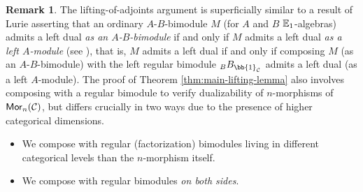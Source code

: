 \documentclass[10pt, reqno, twoside
, final
]{amsart}
\numberwithin{equation}{subsection}%
\theoremstyle{definition}
\theoremstyle{definition}
\theoremstyle{definition}
\theoremstyle{definition}
\theoremstyle{definition}
\theoremstyle{definition}
\theoremstyle{definition}
\theoremstyle{definition}
\theoremstyle{definition}
\theoremstyle{plain}
\theoremstyle{definition}
\theoremstyle{plain}
\theoremstyle{definition}
\theoremstyle{plain}
\theoremstyle{definition}
\newtheorem{rmk}[defn]{Remark}
\theoremstyle{definition}
\theoremstyle{plain}
\theoremstyle{plain}
\theoremstyle{definition}
\theoremstyle{plain}
\theoremstyle{plain}
\theoremstyle{plain}
\begin{document}
\begin{rmk}
The lifting-of-adjoints argument is superficially similar to a result of Lurie asserting that an ordinary $A$-$B$-bimodule $M$ (for $A$ and $B$ $\mathbb{E}_1$-algebras) admits a left dual \emph{as an $A$-$B$-bimodule} if and only if $M$ admits a left dual \emph{as a left $A$-module} (see \cite[Proposition 4.6.2.13]{LurHA}), that is, $M$ admits a left dual if and only if composing $M$ (as an $A$-$B$-bimodule) with the left regular bimodule ${}_BB_{\bb{1}_{\icat}}$ admits a left dual (as a left $A$-module). The proof of Theorem \ref{thm:main-lifting-lemma} also involves composing with a regular bimodule to verify dualizability of $n$-morphisms of $\mathsf{Mor}_n(\mathcal{C})$, but differs crucially in two ways due to the presence of higher categorical dimensions.
\begin{itemize}
    \item We compose with regular (factorization) bimodules living in different categorical levels than the $n$-morphism itself. 
    \item We compose with regular bimodules \emph{on both sides}.
\end{itemize}
\end{rmk}
\end{document}

